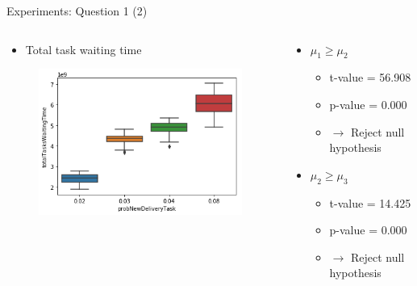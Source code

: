 \begin{frame}{Experiments: Question 1 (2)}
    \begin{columns}

    \begin{column}{0.5\textwidth}  %
        \begin{itemize}
            \item Total task waiting time
        \end{itemize}

        \begin{figure}[hbt]
            \includegraphics[width=1.1\textwidth]{imgs/question1-plot1}
        \end{figure}
    \end{column}

    \begin{column}{0.5\textwidth}
        \begin{itemize}
            \item $\mu_1 \geq \mu_2$
                \begin{itemize}
	                \item t-value = 56.908
	                \item p-value = 0.000
                    \item $\rightarrow$ Reject null hypothesis
                \end{itemize}

            \item $\mu_2 \geq \mu_3$
                \begin{itemize}
	                \item t-value = 14.425
	                \item p-value = 0.000
                    \item $\rightarrow$ Reject null hypothesis
                \end{itemize}


\end{itemize}
\end{column}
\end{columns}
\end{frame}

